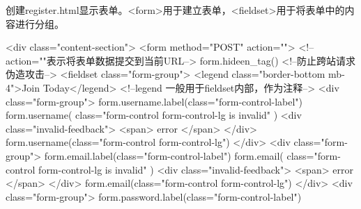       创建register.html显示表单。<form>用于建立表单，<fieldset>用于将表单中的内容进行分组。
      \begin{codeblock}[language=HTMLwithJinja, caption={register.html}]
        {%
        {%
            <div class="content-section">
                <form method="POST" action=""> <!--action=""表示将表单数据提交到当前URL-->
                    {{ form.hideen_tag() }} <!--防止跨站请求伪造攻击-->
                    <fieldset class="form-group">
                        <legend class="border-bottom mb-4">Join Today</legend>
                        <!--legend 一般用于fieldset内部，作为注释-->
                        <div class="form-group">
                            {{ form.username.label(class="form-control-label") }}
                            {%
                                {{ 
                                    form.username(
                                        class="form-control form-control-lg is invalid"
                                    ) 
                                }}
                                <div class="invalid-feedback">
                                    {%
                                        <span>{{ error }}</span>
                                    {%
                                </div>
                            {%
                                {{ form.username(class="form-control form-control-lg") }}
                            {%
                        </div>
                        <div class="form-group">
                            {{ form.email.label(class="form-control-label") }}
                            {%
                                {{ 
                                    form.email(
                                        class="form-control form-control-lg is invalid"
                                    ) 
                                }}
                                <div class="invalid-feedback">
                                    {%
                                        <span>{{ error }}</span>
                                    {%
                                </div>
                            {%
                                {{ form.email(class="form-control form-control-lg") }}
                            {%
                        </div>
                        <div class="form-group">
                            {{ form.password.label(class="form-control-label") }}
}}}}}}}}}}}}
\end{codeblock}

